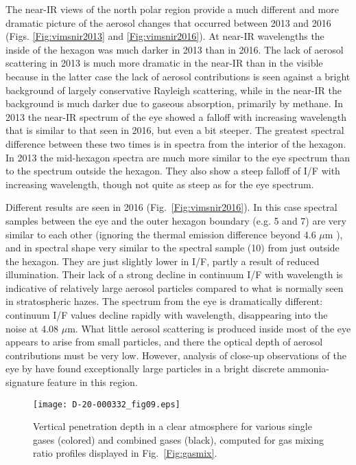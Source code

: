\documentclass[article,11pt]{emulateapj}
\def\mum{$\mu$m }
\def\mumx{$\mu$m}
\begin{document}
The near-IR views of the north polar region provide a much
different and more dramatic picture of the aerosol changes that occurred
between 2013 and 2016 (Figs. \ref{Fig:vimsnir2013} and \ref{Fig:vimsnir2016}).
At near-IR wavelengths the inside of the hexagon was much darker in 2013 than in 2016.  The
lack of aerosol scattering in 2013 is much more dramatic in the
near-IR than in the visible because in the latter case the lack of aerosol
contributions is seen against a bright background of largely conservative
Rayleigh scattering, while in the near-IR the background is much
darker due to gaseous absorption, primarily by methane. In 2013 the
near-IR spectrum of the eye showed a falloff with increasing
wavelength that is similar to that seen in 2016, but even a bit
steeper.  The greatest spectral difference between these two times
is in spectra from the interior of the hexagon.
In 2013 the mid-hexagon spectra are much more similar to the eye
spectrum than to the spectrum outside the hexagon.  They also show a
steep falloff of I/F with increasing wavelength, though not quite as
steep as for the eye spectrum. 

Different results are seen in 2016 (Fig.\ \ref{Fig:vimsnir2016}). In this case spectral samples
 between the eye and 
the outer hexagon boundary (e.g. 5 and 7) are very similar to each other (ignoring the
thermal emission difference beyond 4.6 \mum), and in spectral shape
very similar to the spectral sample (10) from just outside the hexagon. They are just slightly
lower in I/F, partly a result of reduced illumination. Their lack of a strong decline in
continuum I/F with wavelength is indicative of relatively large aerosol particles compared to
what is normally seen in stratospheric hazes. The spectrum from the eye is dramatically
different: continuum I/F values decline rapidly with wavelength, disappearing into
the noise at 4.08 \mumx. What little aerosol scattering is produced inside most of the eye
appears to arise from small particles, and there the optical depth of aerosol contributions
must be very low. However, analysis of close-up observations of the eye by \cite{Baines2018GeoRL}
have found exceptionally large particles in a bright discrete ammonia-signature
feature in this region.

\begin{figure*}[!ht]
\texttt{[image: D-20-000332\_fig09.eps]}
\caption{Vertical penetration depth in a clear atmosphere for various single gases (colored)
and combined gases (black), computed for gas mixing ratio profiles displayed in Fig.\ \ref{Fig:gasmix}.}
\label{Fig:nirpendepth}
\end{figure*}
\end{document}
